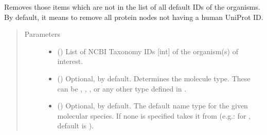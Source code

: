 \documentclass[letterpaper,10pt,english]{sphinxmanual}
\begin{document}
\begin{fulllineitems}
\begin{fulllineitems}
\begin{quote}
\begin{description}
\end{description}\end{quote}

\end{fulllineitems}


\begin{fulllineitems}
\label{\detokenize{main:pypath.main.PyPath.delete_unknown}}
Removes those items which are not in the list of all default
IDs of the organisms. By default, it means to remove all protein
nodes not having a human UniProt ID.
\begin{quote}\begin{description}
\item[{Parameters}] \leavevmode\begin{itemize}
\item {} 
 () \textendash{} List of NCBI Taxonomy IDs {[}int{]} of the organism(s) of
interest.

\item {} 
 () \textendash{} Optional,  by default. Determines the molecule
type. These can be , , ,
 or any other type defined in
.

\item {} 
 () \textendash{} Optional,  by default. The default name type for the
given molecular species. If none is specified takes it from
 (e.g.: for
, default is ).

\end{itemize}

\end{description}\end{quote}


\end{fulllineitems}
\end{fulllineitems}
\end{document}
